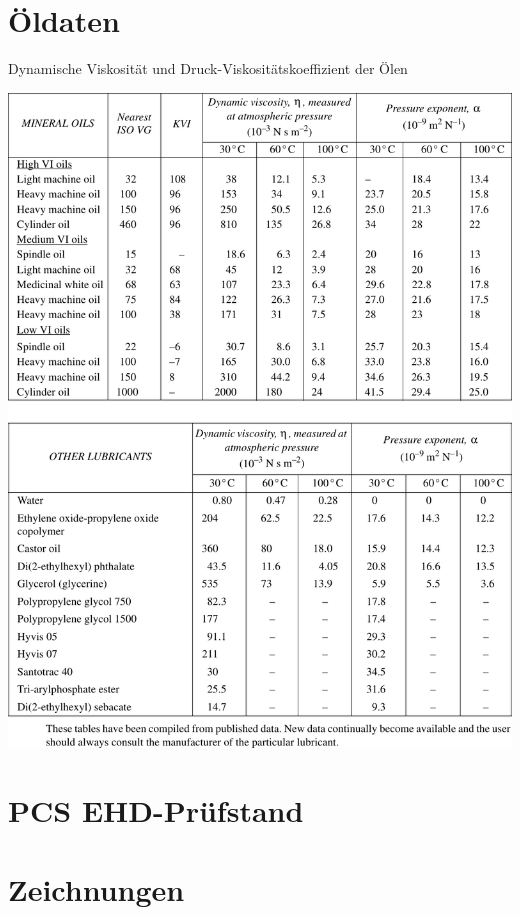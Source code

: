 \begin{appendices}
    \chapter{Öldaten}
        \begin{table}
            \caption{Dynamische Viskosität und Druck-Viskositätskoeffizient der Ölen \cite{esdu_1985}}
            \includegraphics{./tables/esdu_oils_table.pdf}
            \label{tab:esdu_oil_daten}
        \end{table}

    \chapter{PCS EHD-Prüfstand}
        

    \chapter{Zeichnungen}
\end{appendices}

